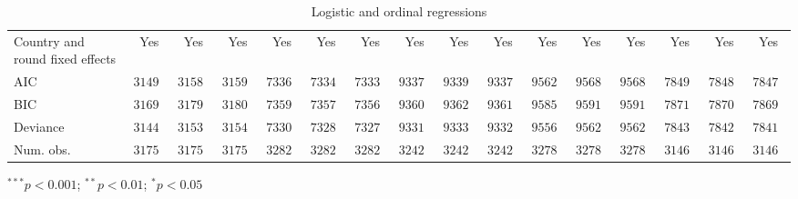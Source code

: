 \begin{table}
\begin{center}
\begin{threeparttable}
\begin{tabular}{l c c c c c c c c c c c c c c c}
\midrule
Country and round fixed effects & Yes           & Yes           & Yes           & Yes           & Yes           & Yes           & Yes           & Yes           & Yes           & Yes           & Yes           & Yes           & Yes           & Yes           & Yes           \\
AIC                             & $31490.73$    & $31586.53$    & $31593.55$    & $73364.05$    & $73340.05$    & $73331.48$    & $93374.44$    & $93392.33$    & $93376.01$    & $95621.79$    & $95684.39$    & $95680.13$    & $78491.26$    & $78481.16$    & $78473.80$    \\
BIC                             & $31699.88$    & $31795.68$    & $31802.69$    & $73599.21$    & $73575.22$    & $73566.65$    & $93609.27$    & $93627.15$    & $93610.84$    & $95856.92$    & $95919.53$    & $95915.27$    & $78716.88$    & $78706.78$    & $78699.42$    \\
Deviance                        & $31440.73$    & $31536.53$    & $31543.55$    & $73308.05$    & $73284.05$    & $73275.48$    & $93318.44$    & $93336.33$    & $93320.01$    & $95565.79$    & $95628.39$    & $95624.13$    & $78437.26$    & $78427.16$    & $78419.80$    \\
Num. obs.                       & $31756$       & $31756$       & $31756$       & $32820$       & $32820$       & $32820$       & $32426$       & $32426$       & $32426$       & $32781$       & $32781$       & $32781$       & $31460$       & $31460$       & $31460$       \\
\bottomrule
\end{tabular}
\begin{tablenotes}[flushleft]
\scriptsize{\item $^{***}p<0.001$; $^{**}p<0.01$; $^{*}p<0.05$}
\end{tablenotes}
\end{threeparttable}
\caption{Logistic and ordinal regressions}
\label{table:coefficients}
\end{center}
\end{table}
